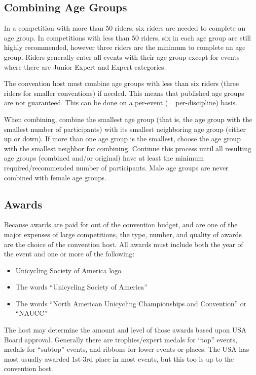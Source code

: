 \subsection{Combining Age Groups}
In a competition with more than 50 riders, six riders are needed to complete an age group.
In competitions with less than 50 riders, six in each age group are still highly recommended, however three riders are the minimum to complete an age group.
Riders generally enter all events with their age group except for events where there are Junior Expert and Expert categories.

The convention host must combine age groups with less than six riders (three riders for smaller conventions) if needed.
This means that published age groups are not guaranteed.
This can be done on a per-event (= per-discipline) basis.

When combining, combine the smallest age group (that is, the age group with the smallest number of participants) with its smallest neighboring age group (either up or down).
If more than one age group is the smallest, choose the age group with the smallest neighbor for combining.
Continue this process until all resulting age groups (combined and/or original) have at least the minimum required/recommended number of participants.
Male age groups are never combined with female age groups.

\subsection{Awards}
Because awards are paid for out of the convention budget, and are one of the major expenses of large competitions, the type, number, and quality of awards are the choice of the convention host. All awards must include both the year of the event and one or more of the following:
\begin{itemize}
\item Unicycling Society of America logo 
\item The words ``Unicycling Society of America''
\item The words ``North American Unicycling Championships and Convention'' or ``NAUCC''
 \end{itemize}
 
The host may determine the amount and level of those awards based upon USA Board approval.
Generally there are trophies/expert medals for ``top'' events, medals for ``subtop'' events, and ribbons for lower events or places.
The USA has most usually awarded 1st-3rd place in most events, but this too is up to the convention host.


